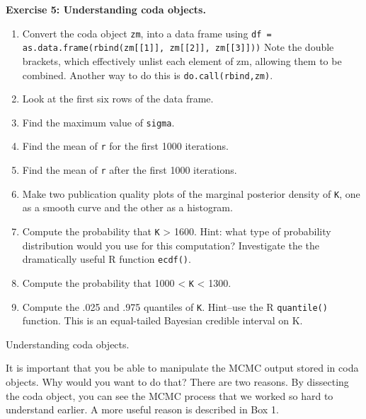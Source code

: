\documentclass[12pt,english]{article}
\begin{document}
\belowcaptionskip=-30pt
\begin{exercise}

\begin{mdframed}
\doublespacing
\textbf{Exercise 5: Understanding coda objects.}
\begin{enumerate}
\item Convert the coda object \texttt{zm}, into a data frame using \texttt{df = as.data.frame(rbind(zm[[1]], zm[[2]], zm[[3]]))}  Note the double brackets, which effectively unlist each element of zm, allowing them to be combined. Another way to do this is \texttt{do.call(rbind,zm)}.
\item Look at the first six rows of the data frame.
\item Find the maximum value of \texttt{sigma}.
\item Find the mean of \texttt{r} for the first 1000 iterations.
\item Find the mean of \texttt{r} after the first 1000 iterations.
\item Make two publication quality plots of the marginal posterior density of \texttt{K}, one as a smooth curve and the other as a histogram.
\item Compute the probability that \texttt{K} > 1600. Hint: what type of probability distribution would you use for this computation?  Investigate the the dramatically useful R function \texttt{ecdf()}.
\item Compute the probability that 1000 < \texttt{K} < 1300.
\item Compute the .025 and .975 quantiles of \texttt{K}.  Hint--use the R \texttt{quantile()} function. This is an equal-tailed Bayesian credible interval on K.
\end{enumerate}
\end{mdframed}
\captionsetup{textformat=empty, labelformat=empty}
\caption[Understanding coda objects]{Understanding coda objects.}
\label{ex:coda understanding}
\end{exercise}
\belowcaptionskip=0pt

It is important that you be able to manipulate the MCMC output stored in coda objects. Why would you want to do that? There are two reasons. By dissecting the coda object, you can see the MCMC process that we worked so hard to understand earlier. A more useful reason is described in Box 1.
\end{document}
